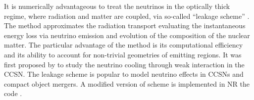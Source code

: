 It is numerically advantageous to treat the neutrinos in the optically thick regime, 
where radiation and matter are coupled, via 
so-called ``leakage scheme''
%
\citep{Ruffert:1995fs,Rosswog:2003rv,Sekiguchi:2010zz,OConnor:2009iuz,Galeazzi:2013mia}. 
%
%
The method approximates the radiation transport evaluating the instantaneous energy loss 
via neutrino emission and evolution of the composition of the nuclear matter.
The particular advantage of the method is its computational efficiency and 
its ability to account for non-trivial geometries of emitting regions.
%
It was first proposed by \citet{vanRiper:1981mko} to study the neutrino cooling through 
weak interaction in the \ac{CCSN}. The leakage scheme is popular to model neutrino 
effects in \acp{CCSN} and compact object mergers.
%
A modified version of \citet{Galeazzi:2013mia} scheme is implemented in 
\ac{NR} the code \wisky{} \citep{Radice:2016dwd,Radice:2018pdn}.




